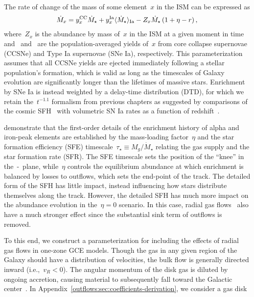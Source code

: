 The rate of change of the mass of some element~$x$ in the ISM can be
expressed as
\begin{equation}
\dot{M}_x = y_\text{$x$}^\text{CC} \dot{M}_\star +
y_\text{$x$}^\text{Ia} \langle \dot{M}_\star \rangle_\text{Ia} -
Z_x \dot{M}_\star \left(1 + \eta - r\right),
\label{outflows:eq:mdot-element}
\end{equation}
where~$Z_x$ is the abundance by mass of~$x$ in the ISM at a given moment in
time and~ and~ are the population-averaged yields of~$x$
from core collapse supernovae (CCSNe) and Type Ia supernovae (SNe Ia),
respectively.
This parameterization assumes that all CCSNe yields are ejected immediately
following a stellar population's formation, which is valid as long as the
timescales of Galaxy evolution are significantly longer than the lifetimes
of massive stars.
Enrichment by SNe Ia is instead weighted by a delay-time distribution (DTD),
for which we retain the~$t^{-1.1}$ formalism from previous chapters as
suggested by comparisons of the cosmic SFH~\citep[e.g.,][]{Madau2017,
Driver2018} with volumetric SN Ia rates as a function of
redshift~\citep{Maoz2012a, Maoz2012b, Graur2013, Graur2014}.
\par
\citet{Weinberg2017b} demonstrate that the first-order details of the
enrichment history of alpha and iron-peak elements are established by
the mass-loading factor~$\eta$ and the star formation efficiency (SFE)
timescale~$\tau_\star \equiv M_g / \dot{M}_\star$ relating the
gas supply and the star formation rate (SFR).
The SFE timescale sets the position of the ``knee'' in the~\afe-\feh~plane,
while~$\eta$ controls the equilibrium abundance at which enrichment is
balanced by losses to outflows, which sets the end-point of the track.
The detailed form of the SFH has little impact, instead influencing how
stars distribute themselves along the track.
However, the detailed SFH has much more impact on the abundance evolution
in the~$\eta = 0$ scenario.
In this case, radial gas flows~\citep[e.g.,][]{Lacey1985}
also have a much stronger effect since the substantial sink term of
outflows is removed.
\par
To this end, we construct a parameterization for including the effects of
radial gas flows in one-zone GCE models.
Though the gas in any given region of the Galaxy should have a distribution of
velocities, the bulk flow is generally directed inward (i.e.,~$v_R < 0$).
The angular momentum of the disk gas is diluted by ongoing accretion, causing
material to subsequently fall toward the Galactic center~\citep{Bilitewski2012}.
In Appendix~\ref{outflows:sec:coefficients-derivation}, we consider a gas disk
